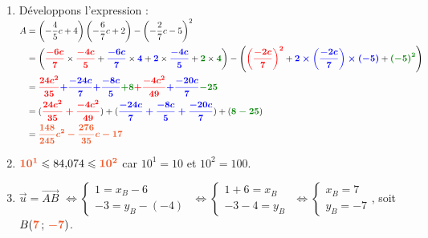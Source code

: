\documentclass[a4paper,11pt]{article}
\begin{document}
\newpage \begin{seance}{} %

\begin{enumerate}
\item  Développons l'expression :\\
  $\begin{aligned}A &=\left(-\dfrac{4}{5}c+4\right)\left(-\dfrac{6}{7}c+2\right)-\left(-\dfrac{2}{7}c-5\right)^2\\&=\left({\color{red}\boldsymbol{\dfrac{-6c}{7}}}\times {\color{red}\boldsymbol{\dfrac{-4c}{5}}}
    +{\color{blue}\boldsymbol{\dfrac{-6c}{7}}}\times {\color{blue}\boldsymbol{4}}
    +{\color{blue}\boldsymbol{2}}\times {\color{blue}\boldsymbol{\dfrac{-4c}{5}}}
    +{\color[HTML]{008002}\boldsymbol{2}}\times {\color[HTML]{008002}\boldsymbol{4}}\right)-\left({\color{red}\boldsymbol{\left( \dfrac{-2c}{7}\right) ^2}}+{\color{blue}\boldsymbol{2\times \left( \dfrac{-2c}{7}\right) \times \left( -5\right) }}+{\color[HTML]{008002}\boldsymbol{\left( -5\right) ^2}}\right)\\&={\color{red}\boldsymbol{\frac{24c^2}{35}}}{\color{blue}\boldsymbol{+\frac{-24c}{7}}}{\color{blue}\boldsymbol{+\frac{-8c}{5}}}{\color[HTML]{008002}\boldsymbol{+8}}{\color{red}\boldsymbol{+\frac{-4c^2}{49}}}{\color{blue}\boldsymbol{+\frac{-20c}{7}}}{\color[HTML]{008002}\boldsymbol{-25}}\\&=({\color{red}\boldsymbol{\frac{24c^2}{35}+\frac{-4c^2}{49}}})+({\color{blue}\boldsymbol{\frac{-24c}{7}+\frac{-8c}{5}+\frac{-20c}{7}}})+({\color[HTML]{008002}\boldsymbol{8-25}})\\&={\color[HTML]{f15929}\boldsymbol{\dfrac{148}{245}c^2-\dfrac{276}{35}c-17}}\end{aligned}$

\item  ${\color[HTML]{f15929}\boldsymbol{10^{1}}} \leqslant 84{,}074 \leqslant {\color[HTML]{f15929}\boldsymbol{10^{2}}}$ car $10^{1} = 10$ et $10^{2} = 100.$

\item  $\overrightarrow{u}=\overrightarrow{AB}$ $\Leftrightarrow\begin{cases}1=x_B-6\\-3=y_B-(-4)\end{cases}$ $\Leftrightarrow\begin{cases}1+6=x_B\\-3-4=y_B\end{cases}$ $\Leftrightarrow\begin{cases}x_B=7\\y_B=-7\end{cases}$, soit $B({\color[HTML]{f15929}\boldsymbol{7}}\,;\,{\color[HTML]{f15929}\boldsymbol{-7}})$.


\end{enumerate}
\end{seance}
\end{document}
